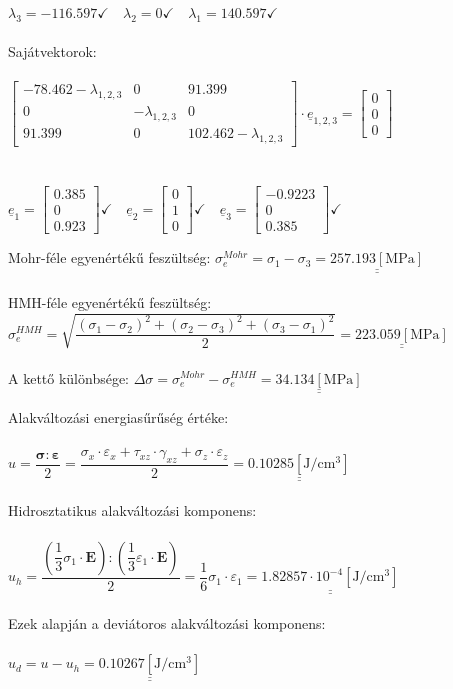 \documentclass[10pt, a4paper]{article}
\newcommand{\hatodik}{\begin{trivlist}\item[\hskip \labelsep {\bfseries 
			{6. Feladat:}}]\end{trivlist}}
\newcommand{\het}{\begin{trivlist}\item[\hskip \labelsep {\bfseries 
			{7. Feladat:}}]\end{trivlist}}
\newcommand{\mpa}{\mathrm{\left[MPa\right]}}
\newcommand{\jpcm}{\mathrm{\left[J/cm^3\right]}}
\begin{document}
	$\lambda_3 = -116.597\checkmark \quad \lambda_2 = 0\checkmark \quad \lambda_1 = 140.597\checkmark$\\\\
	Sajátvektorok:\\\\
	$\begin{bmatrix}
		-78.462-\lambda_{1,2,3} & 0 & 91.399\\
		0 & -\lambda_{1,2,3} & 0\\
		91.399 & 0 & 102.462-\lambda_{1,2,3}
	\end{bmatrix} \cdot \underline{e}_{1,2,3} = \begin{bmatrix}
	0\\
	0\\ 
	0 
	\end{bmatrix}$\\\\\\
	$\underline{e}_1 = \begin{bmatrix}0.385 \\ 0 \\ 0.923\end{bmatrix}\checkmark \quad \underline{e}_2 = \begin{bmatrix}0 \\ 1 \\ 0\end{bmatrix}\checkmark \quad \underline{e}_3 = \begin{bmatrix}-0.9223 \\ 0 \\ 0.385\end{bmatrix}\checkmark$
	\hatodik
	Mohr-féle egyenértékű feszültség: $\sigma_e^{Mohr} = \sigma_1 - \sigma_3 = \underline{\underline{257.193 \mpa}}$\\\\
	HMH-féle egyenértékű feszültség: $\sigma_e^{HMH} = \sqrt{\dfrac{(\sigma_1 - \sigma_2)^2 + (\sigma_2 - \sigma_3)^2 + (\sigma_3 - \sigma_1)^2}{2}} = \underline{\underline{223.059 \mpa}}$\\\\
	A kettő különbsége: $\Delta\sigma = \sigma_e^{Mohr} - \sigma_e^{HMH} = \underline{\underline{34.134 \mpa}}$
	\het
	Alakváltozási energiasűrűség értéke:\\\\
	$u = \dfrac{\boldsymbol{\sigma} : \boldsymbol{\varepsilon}}{2} = \dfrac{\sigma_x \cdot \varepsilon_x + \tau_{xz} \cdot \gamma_{xz} + \sigma_z \cdot \varepsilon_z}{2} = \underline{\underline{0.10285 \jpcm}}$\\\\
	Hidrosztatikus alakváltozási komponens:\\\\
	$u_h =  \dfrac{(\dfrac{1}{3}\sigma_1 \cdot \textbf{E}) : (\dfrac{1}{3}\varepsilon_1 \cdot \textbf{E})}{2} = \dfrac{1}{6}\sigma_1 \cdot \varepsilon_1 = \underline{\underline{1.82857 \cdot 10^{-4} \jpcm}}$\\\\
	Ezek alapján a deviátoros alakváltozási komponens:\\\\
	$u_d = u - u_h = \underline{\underline{0.10267 \jpcm}}$
\end{document}
